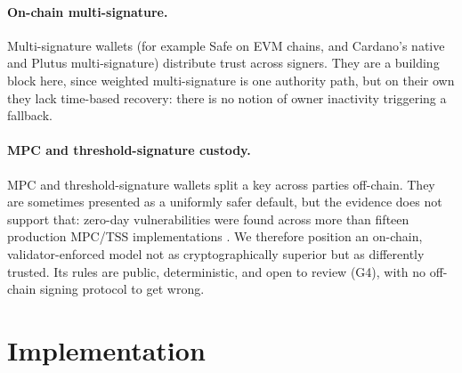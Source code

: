 \documentclass[11pt,DIV=11,parskip=half-]{scrartcl}
\begin{document}
\paragraph{On-chain multi-signature.} Multi-signature wallets (for example Safe \cite{safe} on EVM chains, and Cardano's native and Plutus multi-signature) distribute trust across signers. They are a building block here, since weighted multi-signature is one authority path, but on their own they lack time-based recovery: there is no notion of owner inactivity triggering a fallback.

\paragraph{MPC and threshold-signature custody.} MPC and threshold-signature wallets split a key across parties off-chain. They are sometimes presented as a uniformly safer default, but the evidence does not support that: zero-day vulnerabilities were found across more than fifteen production MPC/TSS implementations \cite{bitForge}. We therefore position an on-chain, validator-enforced model not as cryptographically superior but as differently trusted. Its rules are public, deterministic, and open to review (G4), with no off-chain signing protocol to get wrong.

\section{Implementation}
\label{sec:implementation}

\end{document}
